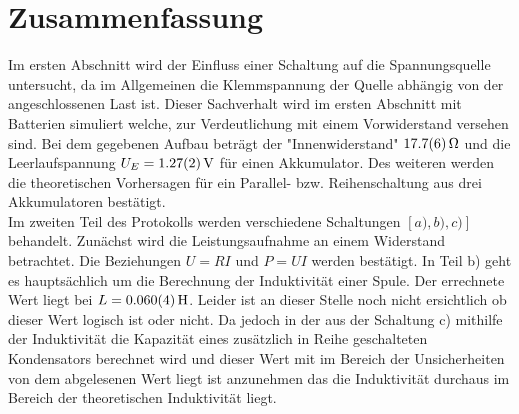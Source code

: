 
\section{Zusammenfassung}

Im ersten Abschnitt wird der Einfluss einer Schaltung auf die Spannungsquelle untersucht, da im Allgemeinen die Klemmspannung der Quelle abhängig von der angeschlossenen Last ist. Dieser Sachverhalt wird im ersten Abschnitt mit Batterien simuliert welche, zur Verdeutlichung mit einem Vorwiderstand versehen sind. Bei dem gegebenen Aufbau beträgt der "Innenwiderstand" $\SI{17.7+-0.6}{\ohm}$ und die Leerlaufspannung $U_E=\SI{1.27+-0.02}{V}$ für einen Akkumulator. Des weiteren werden die theoretischen Vorhersagen für ein Parallel- bzw. Reihenschaltung aus drei Akkumulatoren bestätigt.\\



Im zweiten Teil des Protokolls werden verschiedene Schaltungen  $\left[ a),b),c) \right]$ behandelt.
Zunächst wird die Leistungsaufnahme an einem Widerstand betrachtet. Die Beziehungen $U=RI$ und $P=UI$ werden bestätigt.
In Teil b) geht es hauptsächlich um die Berechnung der Induktivität einer Spule.
Der errechnete Wert liegt bei $L= \SI{0,060+-0,004}{H}$. Leider ist an dieser Stelle noch nicht ersichtlich ob dieser Wert 
logisch ist oder nicht. %
Da jedoch in der aus der Schaltung c) mithilfe der Induktivität die Kapazität eines zusätzlich in Reihe geschalteten Kondensators berechnet wird und dieser Wert mit im Bereich der Unsicherheiten von dem abgelesenen Wert liegt ist anzunehmen das die Induktivität durchaus im Bereich der theoretischen Induktivität liegt.
